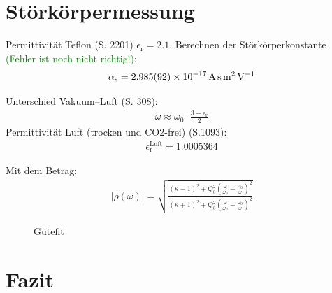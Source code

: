 \documentclass[11pt, a4paper]{scrbook}
\newcommand{\todo}[1]{{\textcolor{Green}{(#1)}}}
\begin{document}
	\chapter{Störkörpermessung}
	Permittivität Teflon \cite{CRC}(S. 2201) $\epsilon_\mathrm{r} = \num{2.1}$.
	Berechnen der Störkörperkonstante \todo{Fehler ist noch nicht richtig!}:
	\begin{align}
		\alpha_\mathrm{s} = \SI{2.985 +- 0.092e-17}{\ampere\second\metre\squared\per\volt}
	\end{align}
	
	Unterschied Vakuum--Luft \cite{pozar} (S. 308):
	\begin{align}
	\omega \approx \omega_0 \cdot \frac{3 - \epsilon_\mathrm{r}}{2}
	\end{align}
	Permittivität Luft (trocken und CO2-frei) \cite{CRC} (S.1093):
	\begin{align}
	\epsilon_\mathrm{r}^\mathrm{Luft} = \num{1.0005364}
	\end{align}

	
	Mit dem Betrag:
	\begin{align}
		| \rho(\omega) | = \sqrt{\frac{(\kappa - 1)^2 + Q_0^2 \left( \frac{\omega}{\omega_0}  - \frac{\omega_0}{\omega}\right)^2}{(\kappa + 1)^2 + Q_0^2 \left( \frac{\omega}{\omega_0}  - \frac{\omega_0}{\omega}\right)^2}}
	\end{align}
	\begin{figure}[ht]
		\centering
		\caption{Gütefit}
		\label{fig:gütefit}
	\end{figure}
	
	
	
	
	\chapter{Fazit}
	     
	\appendix
\end{document}
